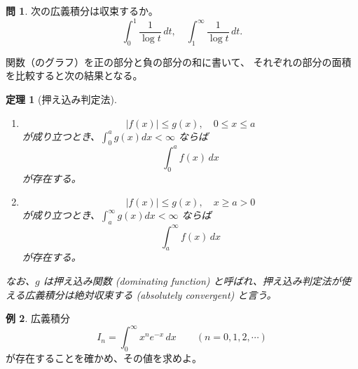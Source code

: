 \documentclass[a4paper]{jsarticle}
\newtheorem{Theorem}{定理}[section]
\theoremstyle{definition}
\newtheorem{Example}[Theorem]{例}
\newtheorem{Exercise}{問}%
\theoremstyle{remark}
\begin{document}
\begin{Exercise}
 次の広義積分は収束するか。
  \[
    \int_0^1 \frac{1}{\log t}\, dt,
    \quad
    \int_1^\infty \frac{1}{\log t}\, dt.
  \]
\end{Exercise}

関数（のグラフ）を正の部分と負の部分の和に書いて、
それぞれの部分の面積を比較すると次の結果となる。

\begin{figure}[htbp]
\centering

\caption{}
\end{figure}

\begin{Theorem}[押え込み判定法]~
\begin{enumerate}
\item
$$|f(x)| \leq g(x),\quad 0\leq x\leq a$$
が成り立つとき、$\int_0^a g(x) dx < \infty$ ならば
$$\int_0^a f(x)\,dx$$
が存在する。
\item
$$|f(x)| \leq g(x),\quad x\geq a>0$$
が成り立つとき、$\int_a^{\infty} g(x) dx < \infty$ ならば
$$\int_a^\infty f(x)\,dx$$
が存在する。
\end{enumerate}
なお、$g$ は押え込み関数 (dominating function) と呼ばれ、押え込み判定法が使える広義積分は絶対収束する (absolutely convergent) と言う。
\end{Theorem}
\par



\bigskip
\begin{Example} 広義積分
$$I_n = \int_0^\infty x^{n}e^{-x}\,dx \qquad (n=0, 1, 2, \cdots)$$
が存在することを確かめ、その値を求めよ。
\end{Example}
\end{document}

